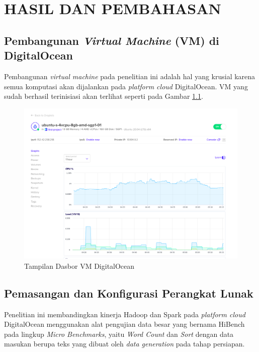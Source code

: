 \chapter{HASIL DAN PEMBAHASAN}

\section{Pembangunan \textit{Virtual Machine} (VM) di DigitalOcean}
Pembangunan \textit{virtual machine} pada penelitian ini adalah hal yang krusial karena semua komputasi akan dijalankan pada \textit{platform cloud} DigitalOcean. VM yang sudah berhasil terinisiasi akan terlihat seperti pada Gambar \ref{fig:00-tampilan-digitalocean}.

\begin{figure}[h]
    \centering
    \includegraphics[width=1\textwidth]{figures/ch04/00-tampilan-digitalocean}
    \caption{Tampilan Dasbor VM DigitalOcean}
    \label{fig:00-tampilan-digitalocean}
\end{figure}


\section{Pemasangan dan Konfigurasi Perangkat Lunak}
Penelitian ini membandingkan kinerja Hadoop dan Spark pada \textit{platform cloud} DigitalOcean menggunakan alat pengujian data besar yang bernama HiBench pada lingkup \textit{Micro Benchmarks}, yaitu \textit{Word Count} dan \textit{Sort} dengan data masukan berupa teks yang dibuat oleh \textit{data generation} pada tahap persiapan. 


